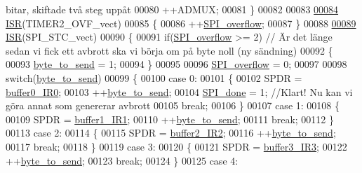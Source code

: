 \begin{DoxyCode}
{       bitar, skiftade två steg uppåt}
00080     ++ADMUX;
00081 \}
00082 
00083 
\hypertarget{sensor_8c_source.tex_l00084}{}\hyperlink{sensor_8c_a7cfcbe42bd266750aeb6e5d71e5ea479}{00084} \hyperlink{sensor_8c_afea150fcd685610cb9f7672fce361e53}{ISR}(TIMER2\_OVF\_vect)
00085 \{
00086     ++\hyperlink{sensor_8h_a2c687b5d4d67e6900cd35ec11107a4ee}{SPI\_overflow};
00087 \}
00088 
\hypertarget{sensor_8c_source.tex_l00089}{}\hyperlink{sensor_8c_af9cad97352f5ba9bbd800446131125a6}{00089} \hyperlink{sensor_8c_afea150fcd685610cb9f7672fce361e53}{ISR}(SPI\_STC\_vect)
00090 \{
00091     \textcolor{keywordflow}{if}(\hyperlink{sensor_8h_a2c687b5d4d67e6900cd35ec11107a4ee}{SPI\_overflow} >= 2)       \textcolor{comment}{// Är det länge sedan vi fick ett avbrott ska vi börja om på
       byte noll (ny sändning)}
00092     \{
00093         \hyperlink{sensor_8h_addd1a9480a36b7d4c52a1237f5c17286}{byte\_to\_send} = 1;
00094     \}
00095 
00096     \hyperlink{sensor_8h_a2c687b5d4d67e6900cd35ec11107a4ee}{SPI\_overflow} = 0;
00097 
00098     \textcolor{keywordflow}{switch}(\hyperlink{sensor_8h_addd1a9480a36b7d4c52a1237f5c17286}{byte\_to\_send})
00099     \{
00100         \textcolor{keywordflow}{case} 0:
00101         \{
00102             SPDR = \hyperlink{sensor_8h_a25e4d5a596b4f9f7dd79548191d5286a}{buffer0\_IR0};
00103             ++\hyperlink{sensor_8h_addd1a9480a36b7d4c52a1237f5c17286}{byte\_to\_send};
00104             \hyperlink{sensor_8h_a320a1ee237ba550bcdffd131a4198e17}{SPI\_done} = 1;       \textcolor{comment}{//Klart! Nu kan vi göra annat som genererar avbrott}
00105             \textcolor{keywordflow}{break};
00106         \}
00107         \textcolor{keywordflow}{case} 1:
00108         \{
00109             SPDR = \hyperlink{sensor_8h_a920bf7cd31f51ba27f4d7154760d6397}{buffer1\_IR1};
00110             ++\hyperlink{sensor_8h_addd1a9480a36b7d4c52a1237f5c17286}{byte\_to\_send};
00111             \textcolor{keywordflow}{break};
00112         \}
00113         \textcolor{keywordflow}{case} 2:
00114         \{
00115             SPDR = \hyperlink{sensor_8h_a7efd4085c0de1446450a923f6b075dc3}{buffer2\_IR2};
00116             ++\hyperlink{sensor_8h_addd1a9480a36b7d4c52a1237f5c17286}{byte\_to\_send};
00117             \textcolor{keywordflow}{break};
00118         \}
00119         \textcolor{keywordflow}{case} 3:
00120         \{
00121             SPDR = \hyperlink{sensor_8h_a11674e633f257caae687446e074c13f6}{buffer3\_IR3};
00122             ++\hyperlink{sensor_8h_addd1a9480a36b7d4c52a1237f5c17286}{byte\_to\_send};
00123             \textcolor{keywordflow}{break};
00124         \}
00125         \textcolor{keywordflow}{case} 4:

\end{DoxyCode}
